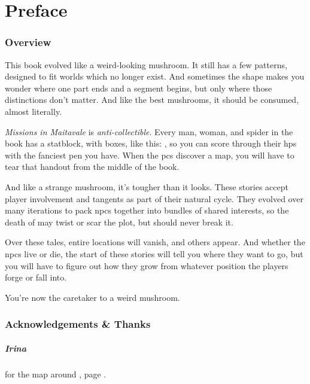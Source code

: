 \chapter{Preface}

\begin{multicols}{2}

\subsection*{Overview}

This book evolved like a weird-looking mushroom.
It still has a few patterns, designed to fit worlds which no longer exist.
And sometimes the shape makes you wonder where one part ends and a segment begins, but only where those distinctions don't matter.
And like the best mushrooms, it should be consumed, almost literally.

\randomdozen
\textit{Missions in Maitavale} is \emph{anti-collectible}.
Every man, woman, and spider in the book has a statblock, with  boxes, like this: \setcounter{wounds}{3} , so you can score through their \glspl{hp} with the fanciest pen you have.
When the \glspl{pc} discover a map, you will have to tear that handout from the middle of the book.
\setcounter{wounds}{0}

And like a strange mushroom, it's tougher than it looks.
These stories accept player involvement and tangents as part of their natural cycle.
They evolved over many iterations to pack \glspl{npc} together into bundles of shared interests, so the death of  may twist or scar the plot, but should never break it.

Over these tales, entire locations will vanish, and others appear.
And whether the \glspl{npc} live or die, the start of these stories will tell you where they want to go, but you will have to figure out how they grow from whatever position the players forge or fall into.

You're now the caretaker to a weird mushroom.

\columnbreak

\subsection*{Acknowledgements \& Thanks}

\paragraph{Irina}
for the map around , page \pageref{Irina/greylands}.


\end{multicols}
